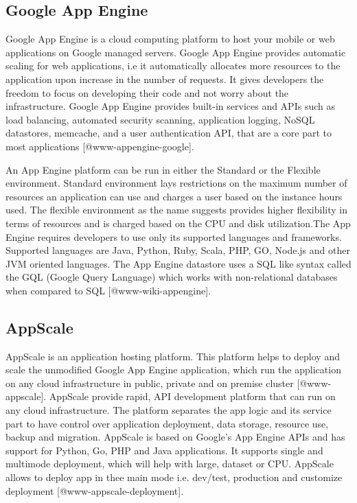\subsection{Google App Engine}

Google App Engine is a cloud computing platform to host your mobile or
web applications on Google managed servers. Google App Engine provides
automatic scaling for web applications, i.e it automatically allocates
more resources to the application upon increase in the number of
requests. It gives developers the freedom to focus on developing their
code and not worry about the infrastructure. Google App Engine
provides built-in services and APIs such as load balancing, automated
security scanning, application logging, NoSQL datastores, memcache,
and a user authentication API, that are a core part to most
applications [@www-appengine-google].
     
An App Engine platform can be run in either the Standard or the
Flexible environment. Standard environment lays restrictions on the
maximum number of resources an application can use and charges a user
based on the instance hours used. The flexible environment as the name
suggests provides higher flexibility in terms of resources and is
charged based on the CPU and disk utilization.The App Engine requires
developers to use only its supported languages and
frameworks. Supported languages are Java, Python, Ruby, Scala, PHP,
GO, Node.js and other JVM oriented languages. The App Engine datastore
uses a SQL like syntax called the GQL (Google Query Language) which
works with non-relational databases when compared to
SQL [@www-wiki-appengine].
    
\subsection{AppScale}

AppScale is an application hosting platform. This platform helps to
deploy and scale the unmodified Google App Engine application, which
run the application on any cloud infrastructure in public, private and
on premise cluster [@www-appscale]. AppScale provide rapid, API
development platform that can run on any cloud infrastructure. The
platform separates the app logic and its service part to have control
over application deployment, data storage, resource use, backup and
migration.  AppScale is based on Google's App Engine APIs and has
support for Python, Go, PHP and Java applications. It supports single
and multimode deployment, which will help with large, dataset or
CPU. AppScale allows to deploy app in thee main mode i.e. dev/test,
production and customize deployment [@www-appscale-deployment].


